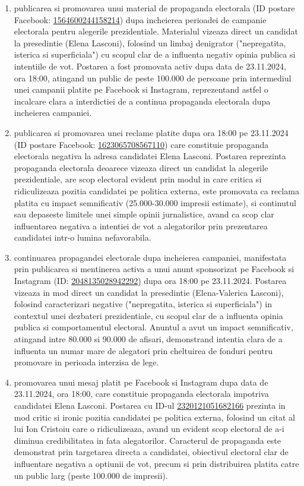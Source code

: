 \documentclass[a4paper,12pt]{article}
\begin{document}
\begin{enumerate}[leftmargin=*, label=\arabic*.)]
    \item publicarea si promovarea unui material de propaganda electorala (ID postare Facebook: \href{https://www.facebook.com/ads/library/?id=1564600244158214}{1564600244158214}) dupa incheierea perioadei de campanie electorala pentru alegerile prezidentiale. Materialul vizeaza direct un candidat la presedintie (Elena Lasconi), folosind un limbaj denigrator ("nepregatita, isterica si superficiala") cu scopul clar de a influenta negativ opinia publica si intentiile de vot. Postarea a fost promovata activ dupa data de 23.11.2024, ora 18:00, atingand un public de peste 100.000 de persoane prin intermediul unei campanii platite pe Facebook si Instagram, reprezentand astfel o incalcare clara a interdictiei de a continua propaganda electorala dupa incheierea campaniei.
    \item publicarea si promovarea unei reclame platite dupa ora 18:00 pe 23.11.2024 (ID postare Facebook: \href{https://www.facebook.com/ads/library/?id=1623065708567110}{1623065708567110}) care constituie propaganda electorala negativa la adresa candidatei Elena Lasconi. Postarea reprezinta propaganda electorala deoarece vizeaza direct un candidat la alegerile prezidentiale, are scop electoral evident prin modul in care critica si ridiculizeaza pozitia candidatei pe politica externa, este promovata ca reclama platita cu impact semnificativ (25.000-30.000 impresii estimate), si continutul sau depaseste limitele unei simple opinii jurnalistice, avand ca scop clar influentarea negativa a intentiei de vot a alegatorilor prin prezentarea candidatei intr-o lumina nefavorabila.
    \item continuarea propagandei electorale dupa incheierea campaniei, manifestata prin publicarea si mentinerea activa a unui anunt sponsorizat pe Facebook si Instagram (ID: \href{https://www.facebook.com/ads/library/?id=2048135028942292}{2048135028942292}) dupa ora 18:00 pe 23.11.2024. Postarea vizeaza in mod direct un candidat la presedintie (Elena-Valerica Lasconi), folosind caracterizari negative ("nepregatita, isterica si superficiala") in contextul unei dezbateri prezidentiale, cu scopul clar de a influenta opinia publica si comportamentul electoral. Anuntul a avut un impact semnificativ, atingand intre 80.000 si 90.000 de afisari, demonstrand intentia clara de a influenta un numar mare de alegatori prin cheltuirea de fonduri pentru promovare in perioada interzisa de lege.
    \item promovarea unui mesaj platit pe Facebook si Instagram dupa data de 23.11.2024, ora 18:00, care constituie propaganda electorala impotriva candidatei Elena Lasconi. Postarea cu ID-ul \href{https://www.facebook.com/ads/library/?id=2320121051682166}{2320121051682166} prezinta in mod critic si ironic pozitia candidatei pe politica externa, folosind un citat al lui Ion Cristoiu care o ridiculizeaza, avand un evident scop electoral de a-i diminua credibilitatea in fata alegatorilor. Caracterul de propaganda este demonstrat prin targetarea directa a candidatei, obiectivul electoral clar de influentare negativa a optiunii de vot, precum si prin distribuirea platita catre un public larg (peste 100.000 de impresii).

\end{enumerate}
\end{document}
